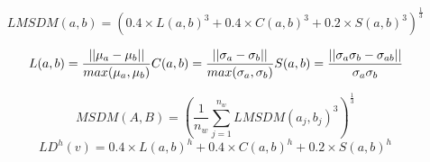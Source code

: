 
\begin{equation}
LMSDM(a,b) = (0.4\times L(a,b)^3+0.4\times C(a,b)^3+0.2\times S(a,b)^3)^{\frac{1}{3}}
\end{equation}

\begin{equation}
 L(a,b) = \frac{||\mu_a-\mu_b||}{max(\mu_a, \mu_b)}\\
 C(a,b) = \frac{||\sigma_a-\sigma_b||}{max(\sigma_a, \sigma_b)}\\
 S(a,b) = \frac{||\sigma_a\sigma_b -\sigma_{ab}||}{\sigma_a\sigma_b}
\end{equation}

\begin{equation}
MSDM(A,B) = (\frac{1}{n_w} \sum_{j=1}^{n_w}{LMSDM(a_j,b_j)^3})^{\frac{1}{3}}
\end{equation}
\begin{equation}
LD^h(v) = 0.4\times L(a,b)^h+0.4\times C(a,b)^h+0.2\times S(a,b)^h
\end{equation}
